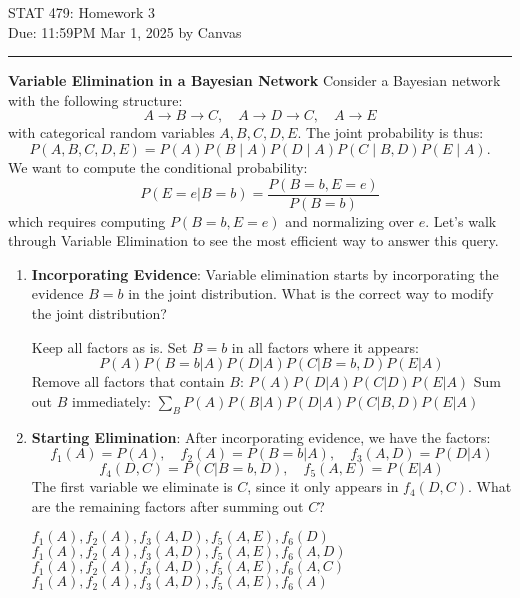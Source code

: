 \documentclass[12pt,letterpaper, onecolumn]{exam}
\begin{document}
\begingroup  
    \centering
    \LARGE STAT 479: Homework 3\\[0.5em]
    \large Due: 11:59PM Mar 1, 2025 by Canvas\\[0.5em]
\endgroup
\rule{\textwidth}{0.4pt}
\pointsdroppedatright   %
\printanswers
\renewcommand{\solutiontitle}{\noindent\textbf{Answer:}\enspace}

\vspace{-20pt}
\begin{questions}
\vspace{-10pt}



\question[20 points]\textbf{Variable Elimination in a Bayesian Network}\droppoints
Consider a Bayesian network with the following structure:  
\[
A \to B \to C, \quad A \to D \to C, \quad A \to E
\]
with categorical random variables $A,B,C,D,E$. The joint probability is thus:
\[
P(A,B,C,D,E) = P(A)P(B\mid A)P(D\mid A)P(C \mid B,D)P(E\mid A).
\]
We want to compute the conditional probability:  
\[
P(E = e | B = b) = \frac{P(B = b, E = e)}{P(B = b)}
\]
which requires computing \( P(B = b, E = e) \) and normalizing over \( e \). Let's walk through Variable Elimination to see the most efficient way to answer this query.

\begin{enumerate}[label=(\alph*)]
    \item \textbf{Incorporating Evidence}: Variable elimination starts by incorporating the evidence \( B = b \) in the joint distribution. What is the correct way to modify the joint distribution?
    \begin{choices}
        \choice Keep all factors as is.
        \choice Set \( B = b \) in all factors where it appears: $$
        P(A) P(B = b | A) P(D | A) P(C | B = b, D) P(E | A)$$
        \choice Remove all factors that contain \( B \):  
        $
        P(A) P(D | A) P(C | D) P(E | A)
        $
        \choice Sum out \( B \) immediately:  
        $
        \sum_B P(A) P(B | A) P(D | A) P(C | B, D) P(E | A)
        $
    \end{choices}

    \item \textbf{Starting Elimination}: After incorporating evidence, we have the factors:
    \[
    f_1(A) = P(A), \quad f_2(A) = P(B = b | A), \quad f_3(A, D) = P(D | A)
    \]
    \[
    f_4(D, C) = P(C | B = b, D), \quad f_5(A, E) = P(E | A)
    \]
    The first variable we eliminate is \( C \), since it only appears in \( f_4(D, C) \). What are the remaining factors after summing out $C$?
    \begin{choices}
        \choice \(f_1(A), f_2(A), f_3(A,D), f_5(A,E), f_6(D) \)
        \choice \(f_1(A), f_2(A), f_3(A,D), f_5(A,E), f_6(A, D) \)
        \choice \(f_1(A), f_2(A), f_3(A,D), f_5(A,E), f_6(A, C) \)
        \choice \(f_1(A), f_2(A), f_3(A,D), f_5(A,E), f_6(A) \)
    \end{choices}


\end{enumerate}
\end{questions}
\end{document}
